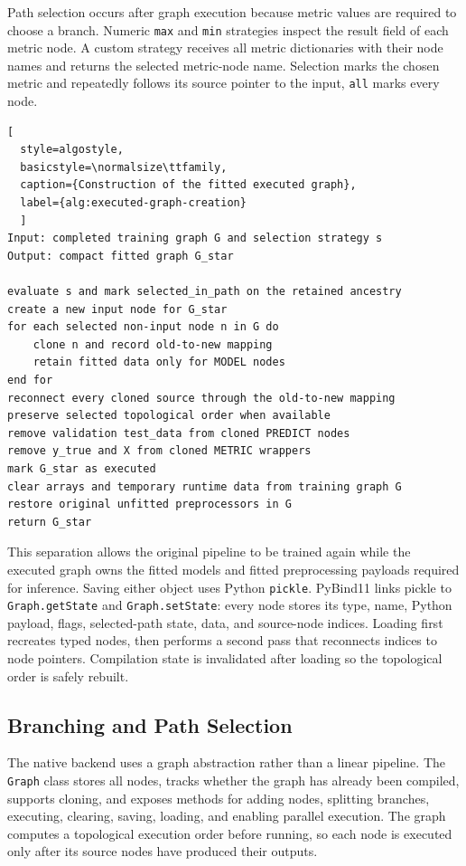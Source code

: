 \documentclass[12pt,a4paper,oneside]{report}
\begin{document}
Path selection occurs after graph execution because metric values are required
to choose a branch. Numeric \texttt{max} and \texttt{min} strategies inspect
the result field of each metric node. A custom strategy receives all metric
dictionaries with their node names and returns the selected metric-node name.
Selection marks the chosen metric and repeatedly follows its source pointer to
the input, \texttt{all} marks every node.

\noindent\begin{minipage}{\textwidth}
\begin{lstlisting}[
  style=algostyle,
  basicstyle=\normalsize\ttfamily,
  caption={Construction of the fitted executed graph},
  label={alg:executed-graph-creation}
  ]
Input: completed training graph G and selection strategy s
Output: compact fitted graph G_star

evaluate s and mark selected_in_path on the retained ancestry
create a new input node for G_star
for each selected non-input node n in G do
    clone n and record old-to-new mapping
    retain fitted data only for MODEL nodes
end for
reconnect every cloned source through the old-to-new mapping
preserve selected topological order when available
remove validation test_data from cloned PREDICT nodes
remove y_true and X from cloned METRIC wrappers
mark G_star as executed
clear arrays and temporary runtime data from training graph G
restore original unfitted preprocessors in G
return G_star
\end{lstlisting}
\end{minipage}

This separation allows the original pipeline to be trained again while the
executed graph owns the fitted models and fitted preprocessing payloads required
for inference. Saving either object uses Python \texttt{pickle}. PyBind11 links
pickle to \texttt{Graph.getState} and \texttt{Graph.setState}: every node stores
its type, name, Python payload, flags, selected-path state, data, and source-node
indices. Loading first recreates typed nodes, then performs a second pass that
reconnects indices to node pointers. Compilation state is invalidated after
loading so the topological order is safely rebuilt.

\subsection{Branching and Path Selection}

The native backend uses a graph abstraction rather than a linear pipeline. The
\texttt{Graph} class stores all nodes, tracks whether the graph has already been
compiled, supports cloning, and exposes methods for adding nodes, splitting
branches, executing, clearing, saving, loading, and enabling parallel execution.
The graph computes a topological execution order before running, so each node is
executed only after its source nodes have produced their outputs.
\end{document}

